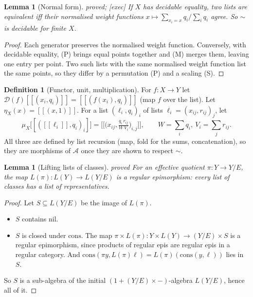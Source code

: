\documentclass[11pt]{article}
\newtheorem{lemma}[theorem]{Lemma}
\theoremstyle{definition}
\newtheorem{definition}[theorem]{Definition}
\theoremstyle{remark}
\newcommand{\st}[1]{\textsf{\small\color{gray}#1}}
\begin{document}
\begin{lemma}[Normal form]\label{lem:nf}\st{proved; [exec]}
If $X$ has decidable equality, two lists are equivalent iff their normalised weight functions $x\mapsto\sum_{x_i=x}q_i/\sum_iq_i$ agree. So $\sim$ is decidable for finite $X$.
\end{lemma}
\begin{proof}
Each generator preserves the normalised weight function. Conversely, with decidable equality, (P) brings equal points together and (M) merges them, leaving one entry per point. Two such lists with the same normalised weight function list the same points, so they differ by a permutation (P) and a scaling (S).
\end{proof}

\begin{definition}[Functor, unit, multiplication]\label{def:dmonad}
For $f:X\to Y$ let $\mathcal D(f)[\![(x_i,q_i)]\!]=[\![(f(x_i),q_i)]\!]$ (map $f$ over the list). Let $\eta_X(x)=[\![(x,1)]\!]$. For a list $(\ell_i,q_i)_i$ of lists $\ell_i=(x_{ij},r_{ij})_j$, let
\[ \mu_X\big[\![([\![\ell_i]\!],q_i)_i]\!\big]=\big[\!\big[\big(x_{ij},\tfrac{q_i\,r_{ij}}{W\,V_i}\big)_{i,j}\big]\!\big],\qquad W=\textstyle\sum_iq_i,\ V_i=\sum_jr_{ij}. \]
All three are defined by list recursion (map, fold for the sums, concatenation), so they are morphisms of $\mathcal A$ once they are shown to respect $\sim$.
\end{definition}

\begin{lemma}[Lifting lists of classes]\label{lem:lift}\st{proved}
For an effective quotient $\pi:Y\to Y/E$, the map $L(\pi):L(Y)\to L(Y/E)$ is a regular epimorphism: every list of classes has a list of representatives.
\end{lemma}
\begin{proof}
Let $S\subseteq L(Y/E)$ be the image of $L(\pi)$.
\begin{itemize}
  \item $S$ contains $\mathrm{nil}$.
  \item $S$ is closed under $\mathrm{cons}$. The map $\pi\times L(\pi):Y\times L(Y)\to(Y/E)\times S$ is a regular epimorphism, since products of regular epis are regular epis in a regular category. And $\mathrm{cons}(\pi y,L(\pi)\ell)=L(\pi)(\mathrm{cons}(y,\ell))$ lies in $S$.
\end{itemize}
So $S$ is a sub-algebra of the initial $(1+(Y/E)\times-)$-algebra $L(Y/E)$, hence all of it.
\end{proof}
\end{document}
